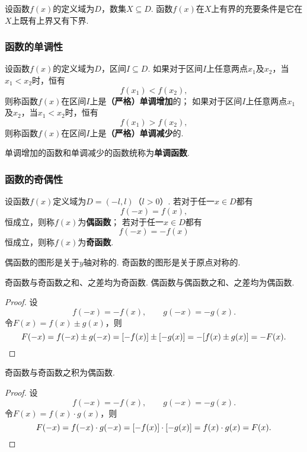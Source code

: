 \begin{theorem}
设函数\(f(x)\)的定义域为\(D\)，数集\(X \subseteq D\).
函数\(f(x)\)在\(X\)上有界的充要条件是它在\(X\)上既有上界又有下界.
\end{theorem}

\subsubsection{函数的单调性}
\begin{definition}
设函数\(f(x)\)的定义域为\(D\)，区间\(I \subseteq D\).
如果对于区间\(I\)上任意两点\(x_1\)及\(x_2\)，当\(x_1 < x_2\)时，恒有\[
f(x_1) < f(x_2),
\]则称函数\(f(x)\)在区间\(I\)上是\textbf{（严格）单调增加}的；
如果对于区间\(I\)上任意两点\(x_1\)及\(x_2\)，当\(x_1 < x_2\)时，恒有\[
f(x_1) > f(x_2),
\]则称函数\(f(x)\)在区间\(I\)上是\textbf{（严格）单调减少}的.

单调增加的函数和单调减少的函数统称为\textbf{单调函数}.
\end{definition}

\subsubsection{函数的奇偶性}
\begin{definition}
设函数\(f(x)\)定义域为\(D=(-l,l)\)（\(l>0\)）.
若对于任一\(x \in D\)都有\[
f(-x) = f(x),
\]恒成立，则称\(f(x)\)为\textbf{偶函数}；
若对于任一\(x \in D\)都有\[
f(-x) = -f(x)
\]恒成立，则称\(f(x)\)为\textbf{奇函数}.
\end{definition}

\begin{property}
偶函数的图形是关于\(y\)轴对称的.
奇函数的图形是关于原点对称的.
\end{property}

\begin{property}
奇函数与奇函数之和、之差均为奇函数.
偶函数与偶函数之和、之差均为偶函数.
\begin{proof}
设\[
f(-x) = -f(x), \qquad g(-x) = -g(x).
\]令\(F(x) = f(x) \pm g(x)\)，则\[
F(-x) = f(-x) \pm g(-x)
= [-f(x)] \pm [-g(x)]
= -[f(x) \pm g(x)]
= -F(x).
\qedhere
\]
\end{proof}
\end{property}

\begin{property}
奇函数与奇函数之积为偶函数.
\begin{proof}
设\[
f(-x) = -f(x), \qquad g(-x) = -g(x).
\]令\(F(x) = f(x) \cdot g(x)\)，则\[
F(-x) = f(-x) \cdot g(-x)
= [-f(x)] \cdot [-g(x)]
= f(x) \cdot g(x)
= F(x).
\qedhere
\]
\end{proof}
\end{property}


